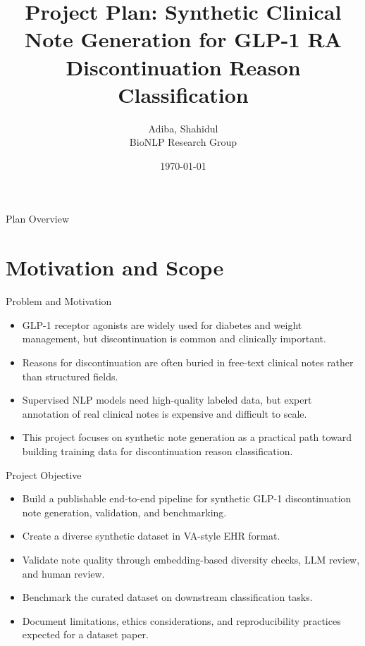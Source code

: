 \documentclass[aspectratio=169]{beamer}
\title{Project Plan: Synthetic Clinical Note Generation for GLP-1 RA Discontinuation Reason Classification}
\author{Adiba, Shahidul \\ BioNLP Research Group}
\date{\today}
\begin{document}
\begin{frame}
    \titlepage
\end{frame}

\begin{frame}{Plan Overview}
    \tableofcontents
\end{frame}

\section{Motivation and Scope}

\begin{frame}{Problem and Motivation}
    \begin{itemize}
        \item GLP-1 receptor agonists are widely used for diabetes and weight management, but discontinuation is common and clinically important.
        \item Reasons for discontinuation are often buried in free-text clinical notes rather than structured fields.
        \item Supervised NLP models need high-quality labeled data, but expert annotation of real clinical notes is expensive and difficult to scale.
        \item This project focuses on synthetic note generation as a practical path toward building training data for discontinuation reason classification.
    \end{itemize}
\end{frame}

\begin{frame}{Project Objective}
    \begin{itemize}
        \item Build a publishable end-to-end pipeline for synthetic GLP-1 discontinuation note generation, validation, and benchmarking.
        \item Create a diverse synthetic dataset in VA-style EHR format.
        \item Validate note quality through embedding-based diversity checks, LLM review, and human review.
        \item Benchmark the curated dataset on downstream classification tasks.
        \item Document limitations, ethics considerations, and reproducibility practices expected for a dataset paper.
    \end{itemize}
\end{frame}
\end{document}
